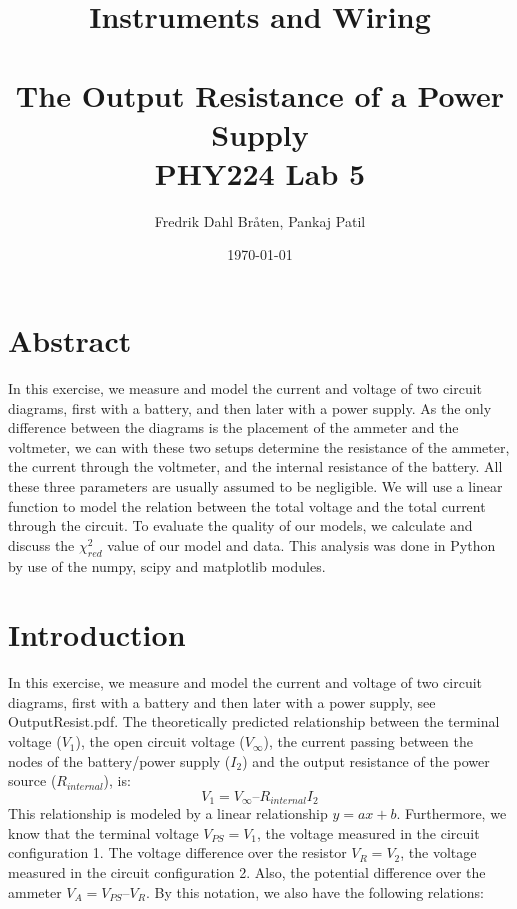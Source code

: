\documentclass[letterpaper,12pt]{article}
\begin{document}
\title{%
Instruments and Wiring \\ \\
\large The Output Resistance of a Power Supply\\
\large PHY224 Lab 5}
\author{Fredrik Dahl Bråten, Pankaj Patil}
\date{\today}
\maketitle

\section{Abstract}

In this exercise, we measure and model the current and voltage of two circuit diagrams, 
first with a battery, and then later with a power supply. As the only difference between 
the diagrams is the placement of the ammeter and the voltmeter, we can with these two setups determine 
the resistance of the ammeter, the current through the voltmeter, and the internal 
resistance of the battery. All these three parameters are usually assumed to be negligible. 
We will use a linear function to model the relation between the total voltage and the total 
current through the circuit. To evaluate the quality of our models, we calculate and discuss 
the $\chi_{red}^2$ value of our model and data. This analysis was done in Python by use of the numpy, scipy and matplotlib modules.

\section{Introduction}

In this exercise, we measure and model the current and voltage of two circuit diagrams, 
first with a battery and then later with a power supply, see OutputResist.pdf. 
The theoretically predicted relationship between the terminal voltage ($V_1$), the open circuit voltage 
($V_{\infty}$), the current passing between the nodes of the battery/power supply ($I_2$) 
and the output resistance of the power source ($R_{internal}$), is:
$$V_1 = V_{\infty} – R_{internal}I_2$$
This relationship is modeled by a linear relationship $y = ax+b$.
Furthermore, we know that the terminal voltage $V_{PS} = V_1$, the voltage measured 
in the circuit configuration 1. The voltage difference over the resistor $V_R = V_2$, 
the voltage measured in the circuit configuration 2. Also, the potential difference over the ammeter $V_A = V_{PS} – V_R$.
By this notation, we also have the following relations: 
\end{document}
